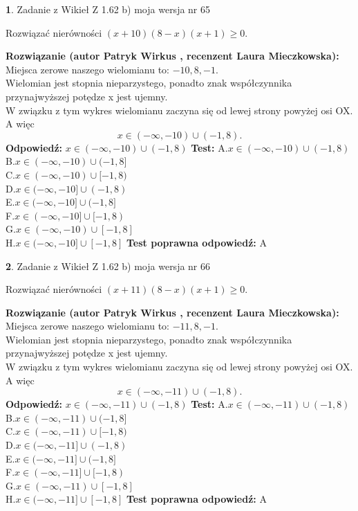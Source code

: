 \documentclass[12pt, a4paper]{article}
\theoremstyle{definition} %
\newtheorem{zad}{}
\newcommand{\zadStart}[1]{\begin{zad}#1\newline}
\newcommand{\zadStop}{\end{zad}}
\newcommand{\rozwStart}[2]{\noindent \textbf{Rozwiązanie (autor #1 , recenzent #2): }\newline}
\newcommand{\rozwStop}{\newline}
\newcommand{\odpStart}{\noindent \textbf{Odpowiedź:}\newline}
\newcommand{\odpStop}{\newline}
\newcommand{\testStart}{\noindent \textbf{Test:}\newline}
\newcommand{\testStop}{\newline}
\newcommand{\kluczStart}{\noindent \textbf{Test poprawna odpowiedź:}\newline}
\newcommand{\kluczStop}{\newline}
\begin{document}
\zadStart{Zadanie z Wikieł Z 1.62 b) moja wersja nr 65}

Rozwiązać nierówności $(x+10)(8-x)(x+1)\ge0$.
\zadStop
\rozwStart{Patryk Wirkus}{Laura Mieczkowska}
Miejsca zerowe naszego wielomianu to: $-10, 8, -1$.\\
Wielomian jest stopnia nieparzystego, ponadto znak współczynnika przy\linebreak najwyższej potędze x jest ujemny.\\ W związku z tym wykres wielomianu zaczyna się od lewej strony powyżej osi OX. A więc $$x \in (-\infty,-10) \cup (-1,8).$$
\rozwStop
\odpStart
$x \in (-\infty,-10) \cup (-1,8)$
\odpStop
\testStart
A.$x \in (-\infty,-10) \cup (-1,8)$\\
B.$x \in (-\infty,-10) \cup (-1,8]$\\
C.$x \in (-\infty,-10) \cup [-1,8)$\\
D.$x \in (-\infty,-10] \cup (-1,8)$\\
E.$x \in (-\infty,-10] \cup (-1,8]$\\
F.$x \in (-\infty,-10] \cup [-1,8)$\\
G.$x \in (-\infty,-10) \cup [-1,8]$\\
H.$x \in (-\infty,-10] \cup [-1,8]$
\testStop
\kluczStart
A
\kluczStop



\zadStart{Zadanie z Wikieł Z 1.62 b) moja wersja nr 66}

Rozwiązać nierówności $(x+11)(8-x)(x+1)\ge0$.
\zadStop
\rozwStart{Patryk Wirkus}{Laura Mieczkowska}
Miejsca zerowe naszego wielomianu to: $-11, 8, -1$.\\
Wielomian jest stopnia nieparzystego, ponadto znak współczynnika przy\linebreak najwyższej potędze x jest ujemny.\\ W związku z tym wykres wielomianu zaczyna się od lewej strony powyżej osi OX. A więc $$x \in (-\infty,-11) \cup (-1,8).$$
\rozwStop
\odpStart
$x \in (-\infty,-11) \cup (-1,8)$
\odpStop
\testStart
A.$x \in (-\infty,-11) \cup (-1,8)$\\
B.$x \in (-\infty,-11) \cup (-1,8]$\\
C.$x \in (-\infty,-11) \cup [-1,8)$\\
D.$x \in (-\infty,-11] \cup (-1,8)$\\
E.$x \in (-\infty,-11] \cup (-1,8]$\\
F.$x \in (-\infty,-11] \cup [-1,8)$\\
G.$x \in (-\infty,-11) \cup [-1,8]$\\
H.$x \in (-\infty,-11] \cup [-1,8]$
\testStop
\kluczStart
A
\kluczStop
\end{document}
